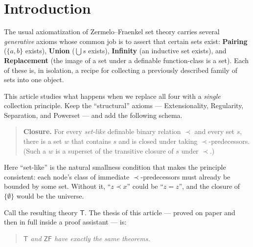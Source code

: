 \documentclass[11pt]{article}
\theoremstyle{plain}
\theoremstyle{definition}
\newcommand{\ZF}{\mathsf{ZF}}
\renewcommand{\ZF}{\textsf{ZF}}
\newcommand{\T}{\textsf{T}}
\begin{document}
\section{Introduction}\label{sec:intro}

The usual axiomatization of Zermelo--Fraenkel set theory carries several
\emph{generative} axioms whose common job is to assert that certain sets exist:
\textbf{Pairing} ($\{a,b\}$ exists), \textbf{Union} ($\bigcup s$ exists),
\textbf{Infinity} (an inductive set exists), and \textbf{Replacement} (the image
of a set under a definable function-class is a set). Each of these is, in
isolation, a recipe for collecting a previously described family of sets into one
object.

This article studies what happens when we replace all four with a \emph{single}
collection principle. Keep the ``structural'' axioms --- Extensionality,
Regularity, Separation, and Powerset --- and add the following schema.

\begin{quote}
\textbf{Closure.} For every \emph{set-like} definable binary relation $\prec$ and
every set $s$, there is a set $w$ that contains $s$ and is closed under taking
$\prec$-predecessors. (Such a $w$ is a superset of the transitive closure of $s$
under $\prec$.)
\end{quote}

Here ``set-like'' is the natural smallness condition that makes the principle
consistent: each node's class of immediate $\prec$-predecessors must already be
bounded by some set. Without it, ``$z \prec x$'' could be ``$z = z$'', and the
closure of $\{\emptyset\}$ would be the universe.

Call the resulting theory $\T$. The thesis of this article --- proved on paper and
then in full inside a proof assistant --- is:

\begin{quote}\itshape
$\T$ and $\ZF$ have exactly the same theorems.
\end{quote}
\end{document}
